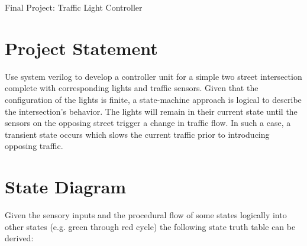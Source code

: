 




%
%

\begin{Large}\begin{center}
Final Project: Traffic Light Controller
\end{center}\end{Large}


%
%

\section{Project Statement}

Use system verilog to develop a controller unit for a simple two street intersection complete with corresponding lights and traffic sensors. Given that the configuration of the lights is finite, a state-machine approach is logical to describe the intersection's behavior. The lights will remain in their current state until the sensors on the opposing street trigger a change in traffic flow. In such a case, a transient state occurs which slows the current traffic prior to introducing opposing traffic.


%
%

\section{State Diagram}

Given the sensory inputs and the procedural flow of some states logically into other states (e.g. green through red cycle) the following state truth table can be derived:

